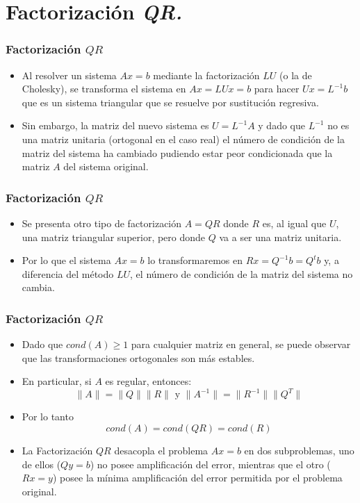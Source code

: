 \documentclass{beamer}
\begin{document}
\section{Factorizaci\'on \it{QR}.}
\begin{frame}
  \frametitle{Factorizaci\'on $QR$}
  \begin{itemize}
    \item<1-> Al resolver un sistema $Ax = b$ mediante la factorizaci\'on $LU$ (o la de Cholesky), se
    transforma el sistema en $Ax = LUx = b$ para hacer $Ux = L^{-1}b$ que es un sistema triangular que se resuelve por sustituci\'on regresiva.
    \item<2-> Sin embargo, la matriz del nuevo sistema es $U = L^{-1}A$ y dado que $L^{-1}$ no es una matriz unitaria (ortogonal en el caso real)
    el n\'umero de condici\'on de la matriz del sistema ha cambiado pudiendo estar peor condicionada que
    la matriz $A$ del sistema original.
  \end{itemize}
\end{frame}
\begin{frame}
  \frametitle{Factorizaci\'on $QR$}
  \begin{itemize}
    \item<1-> Se presenta otro tipo de factorizaci\'on $A = QR$ donde $R$ es, al igual que $U$, una matriz triangular superior, pero
    donde $Q$ va a ser una matriz unitaria.
    \item<2-> Por lo que el sistema $Ax = b$ lo transformaremos en $Rx = Q^{-1}b = Q^tb$ y, a
    diferencia del m\'etodo $LU$, el n\'umero de condici\'on de la matriz del sistema no cambia.
  \end{itemize}
\end{frame}
\begin{frame}
  \frametitle{Factorizaci\'on $QR$}
  \begin{itemize}
    \item<1-> Dado que  $cond(A) \geq 1$ para cualquier matriz en general, se puede observar que las 
    transformaciones ortogonales son m\'as estables.
    \item<2-> En particular, si $A$ es regular, entonces:
    $$
    \|A\| = \|Q\|\|R\| \mbox{ y } \|A^{-1}\|=\|R^{-1}\|\|Q^T\|
    $$
    \item<3-> Por lo tanto
    $$
    cond(A) = cond(QR) = cond(R)
    $$
    \item<4-> La Factorizaci\'on $QR$ desacopla  el problema $Ax=b$ en dos 
    subproblemas, uno de ellos ($Qy=b$) no posee amplificaci\'on del error, mientras que el otro 
    ($Rx=y$) posee la m\'inima amplificaci\'on del error permitida por el problema original.
  \end{itemize}
\end{frame}
\end{document}
